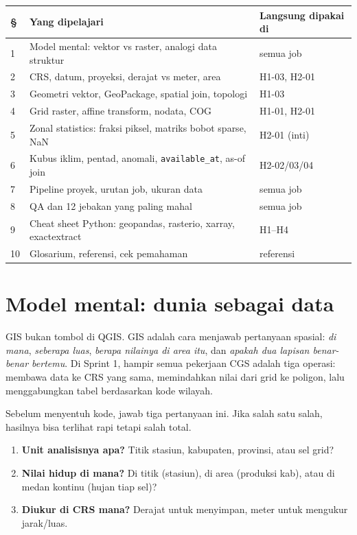 \documentclass[9pt,a4paper]{extarticle}
\newcommand{\code}[1]{\texttt{\small\color{ink}#1}}
\newcommand{\term}[1]{\textit{#1}}
\newcommand{\thead}[1]{\textbf{\color{ink}#1}}
\begin{document}
\begin{table}[H]
\centering
\footnotesize
\begin{tabularx}{\linewidth}{@{}p{0.35cm}>{\RaggedRight\arraybackslash}X>{\RaggedRight\arraybackslash}p{4.3cm}@{}}
\toprule
\rowcolor{bg}\thead{\S} & \thead{Yang dipelajari} & \thead{Langsung dipakai di}\\
\midrule
1 & Model mental: vektor vs raster, analogi data struktur & semua job\\
2 & CRS, datum, proyeksi, derajat vs meter, area & H1-03, H2-01\\
3 & Geometri vektor, GeoPackage, spatial join, topologi & H1-03\\
4 & Grid raster, affine transform, nodata, COG & H1-01, H2-01\\
5 & Zonal statistics: fraksi piksel, matriks bobot sparse, NaN & H2-01 (inti)\\
6 & Kubus iklim, pentad, anomali, \code{available\_at}, as-of join & H2-02/03/04\\
7 & Pipeline proyek, urutan job, ukuran data & semua job\\
8 & QA dan 12 jebakan yang paling mahal & semua job\\
9 & Cheat sheet Python: geopandas, rasterio, xarray, exactextract & H1--H4\\
10 & Glosarium, referensi, cek pemahaman & referensi\\
\bottomrule
\end{tabularx}
\end{table}

\section{Model mental: dunia sebagai data}

GIS bukan tombol di QGIS. GIS adalah cara menjawab pertanyaan spasial: \term{di mana}, \term{seberapa luas}, \term{berapa nilainya di area itu}, dan \term{apakah dua lapisan benar-benar bertemu}. Di Sprint 1, hampir semua pekerjaan CGS adalah tiga operasi: membawa data ke CRS yang sama, memindahkan nilai dari grid ke poligon, lalu menggabungkan tabel berdasarkan kode wilayah.

Sebelum menyentuh kode, jawab tiga pertanyaan ini. Jika salah satu salah, hasilnya bisa terlihat rapi tetapi salah total.

\begin{enumerate}[leftmargin=1.2em,itemsep=0.7pt,topsep=1pt]
  \item \textbf{Unit analisisnya apa?} Titik stasiun, kabupaten, provinsi, atau sel grid?
  \item \textbf{Nilai hidup di mana?} Di titik (stasiun), di area (produksi kab), atau di medan kontinu (hujan tiap sel)?
  \item \textbf{Diukur di CRS mana?} Derajat untuk menyimpan, meter untuk mengukur jarak/luas.
\end{enumerate}
\end{document}
